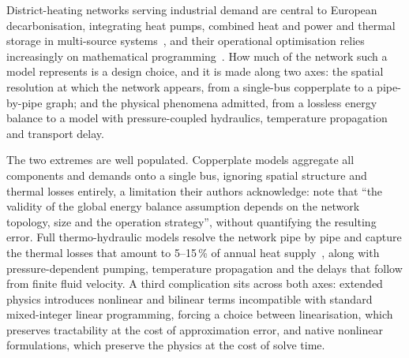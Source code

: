 
District-heating networks serving industrial demand are central to European
decarbonisation, integrating heat pumps, combined heat and power and thermal storage in
multi-source systems~\cite{Lund2014_4GDH}, and their operational optimisation relies
increasingly on mathematical programming~\cite{PereaMoreno2026}. How much of the network
such a model represents is a design choice, and it is made along two axes: the spatial
resolution at which the network appears, from a single-bus copperplate to a pipe-by-pipe
graph; and the physical phenomena admitted, from a lossless energy balance to a model with
pressure-coupled hydraulics, temperature propagation and transport delay.

The two extremes are well populated. Copperplate models aggregate all components and
demands onto a single bus, ignoring spatial structure and thermal losses entirely, a
limitation their authors acknowledge: \citet{Wirtz2020} note that ``the
validity of the global energy balance assumption depends on the network topology, size and
the operation strategy'', without quantifying the resulting error. Full thermo-hydraulic
models resolve the network pipe by pipe and capture the thermal losses that amount to
5--15\,\% of annual heat supply~\cite{Frederiksen2013}, along with pressure-dependent
pumping, temperature propagation and the delays that follow from finite fluid velocity. A
third complication sits across both axes: extended physics introduces nonlinear and
bilinear terms incompatible with standard mixed-integer linear programming, forcing a
choice between linearisation, which preserves tractability at the cost of approximation
error, and native nonlinear formulations, which preserve the physics at the cost of solve
time.

